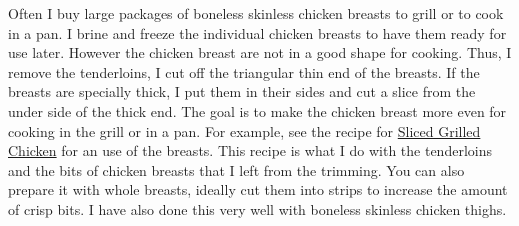 \documentclass[11pt,letterpaper]{article}
\begin{document}


Often I buy large packages of boneless skinless chicken breasts to grill or to cook in a pan. I brine and freeze the individual chicken breasts to have them ready for use later. However the chicken breast are not in a good shape for cooking. Thus, I remove the tenderloins, I cut off the triangular thin end of the breasts. If the breasts are specially thick, I put them in their sides and cut a slice from the under side of the thick end. The goal is to make the chicken breast more even for cooking in the grill or in a pan. For example, see the recipe for \href{SlicedGrilledChicken.html}{Sliced Grilled Chicken} for an use of the breasts. This recipe is what I do with the tenderloins and the bits of chicken breasts that I left from the trimming. You can also prepare it with whole breasts, ideally cut them into strips to increase the amount of crisp bits. I have also done this very well with boneless skinless chicken thighs.
\end{document}
